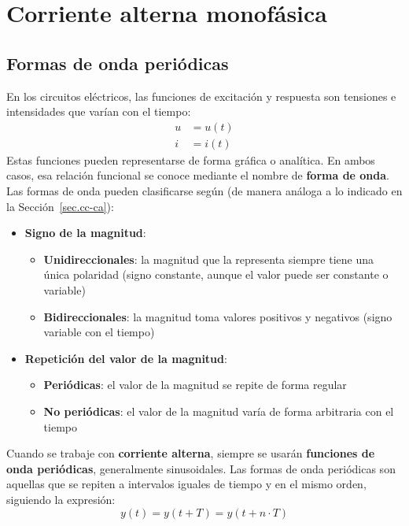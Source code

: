 \chapter{Corriente alterna monofásica}\label{chap.ca_mono}
 	
 	\section{Formas de onda periódicas}
 	
 		En los circuitos eléctricos, las funciones de excitación y respuesta son tensiones
	e intensidades que varían con el tiempo:
	\begin{align*}
		u&=u(t)\\
		i&=i(t)
	\end{align*}
	Estas funciones pueden representarse de forma gráfica o analítica. En ambos
	casos, esa relación funcional se conoce mediante el nombre de \textbf{forma de onda}. Las formas de onda pueden clasificarse según (de manera análoga a lo indicado en la Sección~\ref{sec.cc-ca}):
	\begin{itemize}
		\item \textbf{Signo de la magnitud}:
		\begin{itemize}
			\item \textbf{Unidireccionales}: la magnitud que la representa siempre tiene una única polaridad (signo constante, aunque el valor puede ser constante o variable)
			\item \textbf{Bidireccionales}: la magnitud toma valores positivos y negativos (signo variable con el tiempo)
		\end{itemize}
		\item \textbf{Repetición del valor de la magnitud}:
		\begin{itemize}
			\item \textbf{Periódicas}: el valor de la magnitud se repite de forma regular
			\item \textbf{No periódicas}: el valor de la magnitud varía de forma arbitraria con el tiempo
		\end{itemize}
	\end{itemize}

	Cuando se trabaje con \textbf{corriente alterna}, siempre se usarán \textbf{funciones de onda periódicas}, generalmente sinusoidales. Las formas de onda periódicas son aquellas que se repiten a intervalos iguales de tiempo y en el mismo orden, siguiendo la expresión:
	\begin{equation*}
		y(t)=y(t+T)=y(t+n\cdot T)
	\end{equation*}
	
